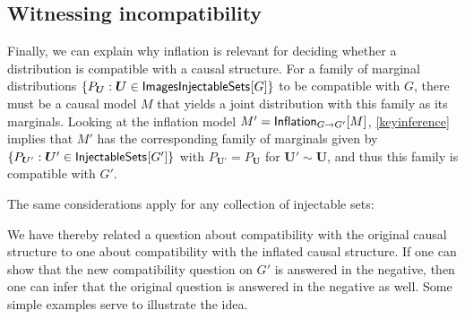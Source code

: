 \subsection{Witnessing incompatibility\label{subsec:witnessingincompat}}

Finally, we can explain why inflation is relevant for deciding whether a distribution is compatible with a causal structure.  For a family of marginal distributions $\{ P_{\bm{U}} : \bm{U} \in \SmallNamedFunction{ImagesInjectableSets}{G}\}$ to be compatible with $G$, there must be a causal model $M$ that yields a joint distribution with this family as its marginals. Looking at the inflation model $M' = \SmallNamedFunction[G\to G']{Inflation}{M}$, \cref{keyinference} implies that $M'$ has the corresponding family of marginals given by $\{ P_{\bm{U}'} : \bm{U}' \in \SmallNamedFunction{InjectableSets}{G'}\}$ with $P_{\bm{U}'} = P_{\bm{U}}$ for $\bm{U}'\sim\bm{U}$, and thus this family is compatible with $G'$.

The same considerations apply for any collection of injectable sets:


We have thereby related a question about compatibility with the original causal structure to one about compatibility with the inflated causal structure.  If one can show that the new compatibility question on $G'$ is answered in the negative, then one can infer that the original question is answered in the negative as well.    Some simple examples serve to illustrate the idea.





\par\smallskip\nobreak

